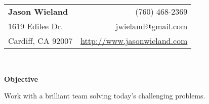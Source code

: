 \documentclass[letterpaper,11pt]{article}
\newcommand{\resheading}[1]{{\large \colorbox{mygrey}{\begin{minipage}{\textwidth}{\textbf{#1 \vphantom{p\^{E}}}}\end{minipage}}}}
\begin{document}
\newcommand{\infoheader}{
  \begin{tabular*}{7.5in}{l@{\extracolsep{\fill}}r}
    \textbf{\LARGE Jason Wieland}  & (760) 468-2369\\
    1619 Edilee Dr. &  jwieland@gmail.com \\
    Cardiff, CA 92007 & \url{http://www.jasonwieland.com} \\
  \end{tabular*}
  \\

  \vspace{0.1in}
}

\newcommand{\pagebreakwithheader}{\pagebreak\infoheader}

\infoheader

\resheading{Objective}
\begin{description}
\item Work with a brilliant team solving today's challenging problems.
\end{description}
\end{document}
